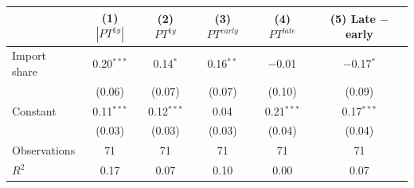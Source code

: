 \begin{tabular}{lccccc}
\toprule
 & (1) $|PT^{1y}|$ & (2) $PT^{1y}$ & (3) $PT^{early}$ & (4) $PT^{late}$ & (5) Late $-$ early \\
\midrule
Import share & 0.20$^{***}$ & 0.14$^{*}$ & 0.16$^{**}$ & $-$0.01$^{}$ & $-$0.17$^{*}$ \\
 & (0.06) & (0.07) & (0.07) & (0.10) & (0.09) \\
Constant & 0.11$^{***}$ & 0.12$^{***}$ & 0.04$^{}$ & 0.21$^{***}$ & 0.17$^{***}$ \\
 & (0.03) & (0.03) & (0.03) & (0.04) & (0.04) \\
Observations & 71 & 71 & 71 & 71 & 71 \\
$R^2$ & 0.17 & 0.07 & 0.10 & 0.00 & 0.07 \\
\bottomrule
\end{tabular}
